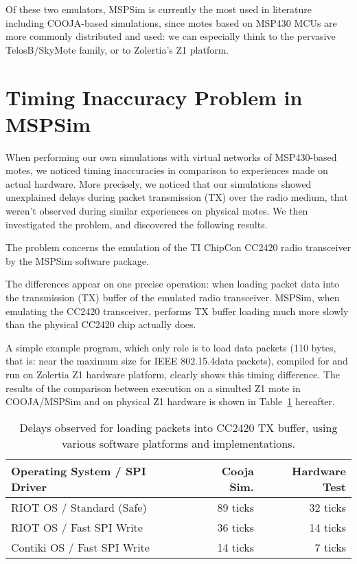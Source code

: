 \documentclass[a4paper,10pt]{article}
\begin{document}
Of these two emulators, MSPSim is currently the most used in literature
including COOJA-based simulations, since motes based on MSP430 MCUs are
more commonly distributed and used: we can especially think to the pervasive
TelosB/SkyMote family, or to Zolertia's Z1 platform.


\section{Timing Inaccuracy Problem in MSPSim}

When performing our own simulations with virtual networks of MSP430-based
motes, we noticed timing inaccuracies in comparison to experiences made
on actual hardware. More precisely, we noticed that our simulations showed
unexplained delays during packet transmission (TX) over the radio medium,
that weren't observed during similar experiences on physical motes.
We then investigated the problem, and discovered the following results.

The problem concerns the emulation of the TI ChipCon CC2420 radio
transceiver by the MSPSim software package.

The differences appear on one precise operation: when loading packet data
into the transmission (TX) buffer of the emulated radio transceiver.
MSPSim, when emulating the CC2420 transceiver, performs TX buffer loading
much more slowly than the physical CC2420 chip actually does.

A simple example program, which only role is to load data packets
(110 bytes, that is: near the maximum size for IEEE
802.15.4\footnotemark[1] data packets), compiled for and run on
Zolertia Z1 hardware platform, clearly shows this timing difference.
The results of the comparison between execution on a simulted Z1 mote
in COOJA/MSPSim and on physical Z1 hardware is shown in
Table~\ref{TblTXPktLoadDelays} hereafter.


\begin{table}[!h]
\centering
\begin{tabular}{|l|r|r|}
\hline
Operating System / SPI Driver &  Cooja Sim.  & Hardware Test \\
\hline
RIOT OS / Standard (Safe)     &   89 ticks   &  32 ticks \\ 
RIOT OS / Fast SPI Write      &   36 ticks   &  14 ticks \\
Contiki OS / Fast SPI Write   &   14 ticks   &   7 ticks \\
\hline
\end{tabular}
\caption{\small Delays observed for loading packets into CC2420 TX buffer,
using various software platforms and implementations.}
\label{TblTXPktLoadDelays}
\end{table}
\end{document}
